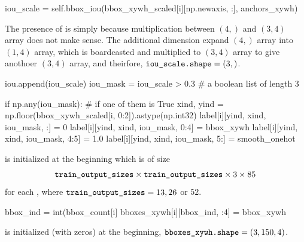 \documentclass[10pt,a4paper]{article}
\begin{document}
\begin{py}
            iou_scale = self.bbox_iou(bbox_xywh_scaled[i][np.newaxis, :], anchors_xywh)
\end{py}
The presence of  is simply because multiplication between $(4,)$  and $(3,4)$ array does not make sense. The additional dimension expand $(4,)$ array into $(1,4)$ array, which is boardcasted and multiplied to $(3,4)$ array to give anothoer $(3,4)$ array, and theirfore, $\code{iou_scale.shape} = (3, )$.
\begin{py}
            iou.append(iou_scale)
            iou_mask = iou_scale > 0.3 # a boolean list of length 3

            if np.any(iou_mask): # if one of them is True
                xind, yind = np.floor(bbox_xywh_scaled[i, 0:2]).astype(np.int32)
                label[i][yind, xind, iou_mask, :] = 0
                label[i][yind, xind, iou_mask, 0:4] = bbox_xywh
                label[i][yind, xind, iou_mask, 4:5] = 1.0
                label[i][yind, xind, iou_mask, 5:] = smooth_onehot
\end{py}
 is initialized at the beginning which is of size 
\[\code{train_output_sizes}\times \code{train_output_sizes}\times 3\times 85\]
for each , where $\code{train_output_sizes} = 13,26$ or $52$. 
\begin{py}
                bbox_ind = int(bbox_count[i] %
                bboxes_xywh[i][bbox_ind, :4] = bbox_xywh
\end{py}
 is initialized (with zeros) at the beginning, $\code{bboxes_xywh.shape} = (3,150,4)$.
\end{document}
